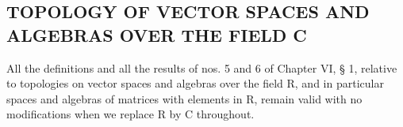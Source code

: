 \subsection{TOPOLOGY OF VECTOR SPACES AND ALGEBRAS OVER THE FIELD C}

All the definitions and all the results of nos. 5 and 6 of Chapter VI, § 1, relative to topologies on vector spaces and algebras over the field R, and in particular spaces and algebras of matrices with elements in R, remain valid with no modifications when we replace R by C throughout.

